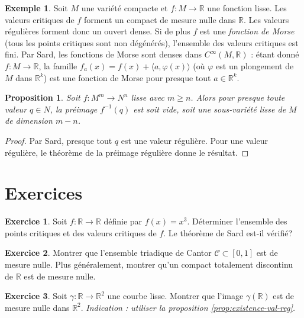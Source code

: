 \documentclass[12pt,a4paper,openany]{book}
\theoremstyle{definition}
\newtheorem{exemple}[definition]{Exemple}
\newtheorem{exercice}{Exercice}[chapter]
\theoremstyle{plain}
\newtheorem{proposition}[definition]{Proposition}
\theoremstyle{remark}
\newcommand{\R}{\mathbb{R}}
\begin{document}
\begin{exemple}\label{ex:sard-Morse}
Soit $M$ une variété compacte et $f \colon M \to \R$ une fonction lisse.
Les valeurs critiques de $f$ forment un compact de mesure nulle dans $\R$.
Les valeurs régulières forment donc un ouvert dense. Si de plus $f$ est
une \emph{fonction de Morse} (tous les points critiques sont non dégénérés),
l'ensemble des valeurs critiques est fini. Par Sard, les fonctions de Morse
sont denses dans $C^\infty(M, \R)$ : étant donné $f \colon M \to \R$, la
famille $f_a(x) = f(x) + \langle a, \varphi(x) \rangle$ (où $\varphi$ est
un plongement de $M$ dans $\R^k$) est une fonction de Morse pour presque
tout $a \in \R^k$.
\end{exemple}

\begin{proposition}\label{prop:preimage-reguliere-sard}
Soit $f \colon M^m \to N^n$ lisse avec $m \geq n$. Alors pour presque toute
valeur $q \in N$, la préimage $f^{-1}(q)$ est soit vide, soit une sous-variété
lisse de $M$ de dimension $m - n$.
\end{proposition}

\begin{proof}
Par Sard, presque tout $q$ est une valeur régulière. Pour une valeur régulière,
le théorème de la préimage régulière donne le résultat.
\end{proof}

\section{Exercices}\label{sec:exos-sard}

\begin{exercice}\label{exo:sard-1}
Soit $f \colon \R \to \R$ définie par $f(x) = x^3$. Déterminer l'ensemble des
points critiques et des valeurs critiques de $f$. Le théorème de Sard
est-il vérifié?
\end{exercice}

\begin{exercice}\label{exo:sard-2}
Montrer que l'ensemble triadique de Cantor $\mathcal{C} \subset [0,1]$ est de
mesure nulle. Plus généralement, montrer qu'un compact totalement discontinu
de $\R$ est de mesure nulle.
\end{exercice}

\begin{exercice}\label{exo:sard-3}
Soit $\gamma \colon \R \to \R^2$ une courbe lisse. Montrer que l'image
$\gamma(\R)$ est de mesure nulle dans $\R^2$.
\textit{Indication : utiliser la proposition \ref{prop:existence-val-reg}.}
\end{exercice}
\end{document}
